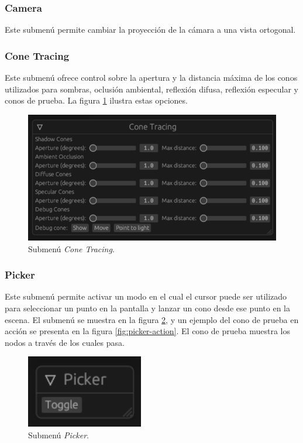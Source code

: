 \subsubsection{Camera}

Este submenú permite cambiar la proyección de la cámara a una vista ortogonal.

\subsubsection{Cone Tracing}

Este submenú ofrece control sobre la apertura y la distancia máxima de los conos utilizados para sombras, oclusión ambiental, reflexión difusa, reflexión especular y conos de prueba. La figura \ref{fig:cone_tracing} ilustra estas opciones.

\begin{figure}[h]
    \centering
    \includegraphics[width=.5\textwidth]{cone_tracing.png}
    \caption{Submenú \textit{Cone Tracing}.}
    \label{fig:cone_tracing}
\end{figure}

\subsubsection{Picker}

Este submenú permite activar un modo en el cual el cursor puede ser utilizado para seleccionar un punto en la pantalla y lanzar un cono desde ese punto en la escena. El submenú se muestra en la figura \ref{fig:picker-menu}, y un ejemplo del cono de prueba en acción se presenta en la figura \ref{fig:picker-action}. El cono de prueba muestra los nodos a través de los cuales pasa.

\begin{figure}[h]
    \centering
    \includegraphics[width=.5\textwidth]{picker-menu.png}
    \caption{Submenú \textit{Picker}.}
    \label{fig:picker-menu}
\end{figure}

